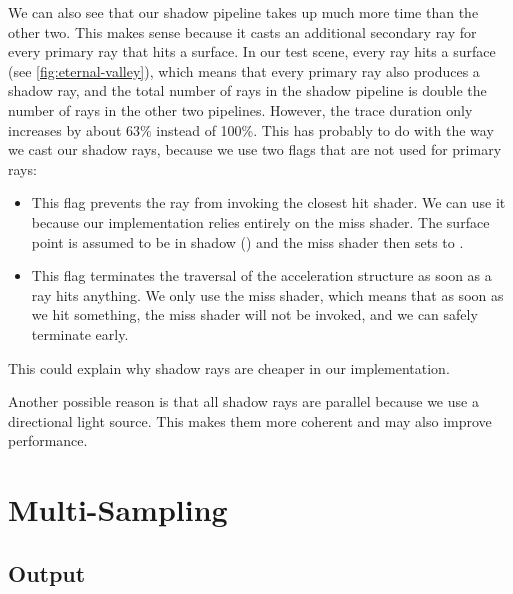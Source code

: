 We can also see that our shadow pipeline takes up much more time than the other two. This makes sense because it casts an additional secondary ray for every primary ray that hits a surface. In our test scene, every ray hits a surface (see \autoref{fig:eternal-valley}), which means that every primary ray also produces a shadow ray, and the total number of rays in the shadow pipeline is double the number of rays in the other two pipelines. However, the trace duration only increases by about 63\% instead of 100\%. This has probably to do with the way we cast our shadow rays, because we use two flags that are not used for primary rays:

\begin{itemize}

  \item {}

  This flag prevents the ray from invoking the closest hit shader. We can use it because our implementation relies entirely on the miss shader. The surface point is assumed to be in shadow () and the miss shader then sets  to .

  \item {}
   
  This flag terminates the traversal of the acceleration structure as soon as a ray hits anything. We only use the miss shader, which means that as soon as we hit something, the miss shader will not be invoked, and we can safely terminate early.

\end{itemize}

This could explain why shadow rays are cheaper in our implementation.

Another possible reason is that all shadow rays are parallel because we use a directional light source. This makes them more coherent and may also improve performance.

\section{Multi-Sampling}

\subsection{Output}

